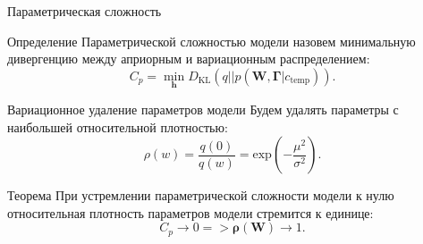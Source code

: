 \documentclass[usenames,dvipsnames,11pt,pdf,utf8,russian,aspectratio=43]{beamer}
\begin{document}
\begin{frame}{Параметрическая сложность}
\begin{block}{Определение}
Параметрической сложностью модели назовем минимальную дивергенцию между априорным и вариационным распределением:
\[
    C_p = \min_{\mathbf{h}} D_\text{KL}(q||p(\mathbf{W}, \boldsymbol{\Gamma}|c_\text{temp})).
\]
\end{block}
\begin{block}{Вариационное удаление параметров модели}
Будем удалять параметры с наибольшей относительной плотностью:
\[
\rho(w) = \frac{q(0)}{q(w)} = \text{exp}\left(-\frac{\mu^2}{\sigma^2}\right).
\]
\end{block}
\begin{block}{Теорема}
При устремлении параметрической сложности модели к нулю относительная плотность параметров модели стремится к единице:
\[
    C_p \to 0 => \boldsymbol{\rho}(\mathbf{W}) \to 1.
\]
\end{block}


\end{frame}
\end{document}
